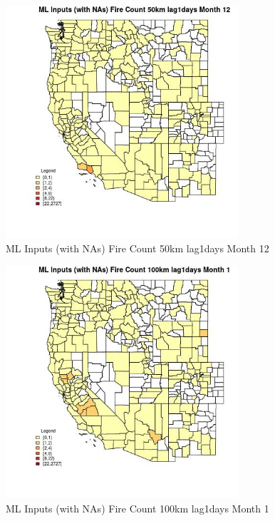 \begin{figure} 
\centering  
\includegraphics[width=0.77\textwidth]{Code_Outputs/Report_ML_input_PM25_Step4_part_f_de_duplicated_aves_prioritize_24hr_obswNAs_CountyFire_Count_50km_lag1daysmedianMonth12.jpg} 
\caption{\label{fig:Report_ML_input_PM25_Step4_part_f_de_duplicated_aves_prioritize_24hr_obswNAsCountyFire_Count_50km_lag1daysmedianMonth12}ML Inputs (with NAs) Fire Count 50km lag1days Month 12} 
\end{figure} 
 

\begin{figure} 
\centering  
\includegraphics[width=0.77\textwidth]{Code_Outputs/Report_ML_input_PM25_Step4_part_f_de_duplicated_aves_prioritize_24hr_obswNAs_CountyFire_Count_100km_lag1daysmedianMonth1.jpg} 
\caption{\label{fig:Report_ML_input_PM25_Step4_part_f_de_duplicated_aves_prioritize_24hr_obswNAsCountyFire_Count_100km_lag1daysmedianMonth1}ML Inputs (with NAs) Fire Count 100km lag1days Month 1} 
\end{figure} 
 

